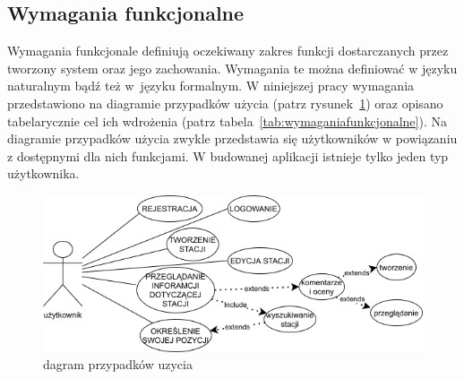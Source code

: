 \subsection{Wymagania funkcjonalne}
Wymagania funkcjonale definiują oczekiwany zakres funkcji dostarczanych przez tworzony system oraz jego zachowania. Wymagania te można definiować w języku naturalnym bądź też w~języku formalnym. W niniejszej pracy wymagania przedstawiono na diagramie przypadków użycia (patrz rysunek~\ref{fig:usecasediagram}) oraz opisano tabelarycznie cel ich wdrożenia (patrz tabela~\ref{tab:wymaganiafunkcjonalne}).
Na diagramie przypadków użycia zwykle przedstawia się użytkowników w powiązaniu z dostępnymi dla nich funkcjami. W budowanej aplikacji istnieje tylko jeden typ użytkownika. 
\begin{figure}[ht]
    \centering
        \includegraphics[width=0.7\linewidth]{rys02/use_case_diagram1.png}
        \caption{dagram przypadków uzycia}
    \label{fig:usecasediagram}
\end{figure}

